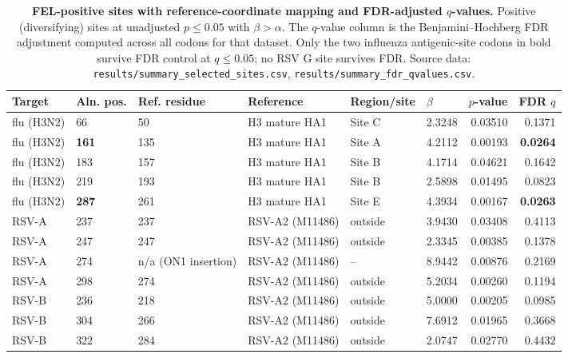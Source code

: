 \documentclass[11pt]{article}
\begin{document}
\begin{table}[H]
\centering
\scriptsize
\setlength{\tabcolsep}{3pt}
\caption{\textbf{FEL-positive sites with reference-coordinate mapping and FDR-adjusted $q$-values.} Positive (diversifying) sites at unadjusted $p\leq0.05$ with $\beta>\alpha$. The $q$-value column is the Benjamini--Hochberg FDR adjustment computed across all codons for that dataset. Only the two influenza antigenic-site codons in bold survive FDR control at $q\leq0.05$; no RSV G site survives FDR. Source data: \texttt{results/summary\_selected\_sites.csv}, \texttt{results/summary\_fdr\_qvalues.csv}.}
\label{tab:selected_sites}
\begin{tabular}{lllp{2.5cm}llrr}
\toprule
Target & Aln. pos. & Ref. residue & Reference & Region/site & $\beta$ & $p$-value & FDR $q$ \\
\midrule
flu (H3N2) & 66 & 50 & H3 mature HA1 & Site C & 2.3248 & 0.03510 & 0.1371 \\
flu (H3N2) & \textbf{161} & 135 & H3 mature HA1 & Site A & 4.2112 & 0.00193 & \textbf{0.0264} \\
flu (H3N2) & 183 & 157 & H3 mature HA1 & Site B & 4.1714 & 0.04621 & 0.1642 \\
flu (H3N2) & 219 & 193 & H3 mature HA1 & Site B & 2.5898 & 0.01495 & 0.0823 \\
flu (H3N2) & \textbf{287} & 261 & H3 mature HA1 & Site E & 4.3934 & 0.00167 & \textbf{0.0263} \\
RSV-A & 237 & 237 & RSV-A2 (M11486) & outside & 3.9430 & 0.03408 & 0.4113 \\
RSV-A & 247 & 247 & RSV-A2 (M11486) & outside & 2.3345 & 0.00385 & 0.1378 \\
RSV-A & 274 & n/a (ON1 insertion) & RSV-A2 (M11486) & -- & 8.9442 & 0.00876 & 0.2169 \\
RSV-A & 298 & 274 & RSV-A2 (M11486) & outside & 5.2034 & 0.00260 & 0.1194 \\
RSV-B & 236 & 218 & RSV-A2 (M11486) & outside & 5.0000 & 0.00205 & 0.0985 \\
RSV-B & 304 & 266 & RSV-A2 (M11486) & outside & 7.6912 & 0.01965 & 0.3668 \\
RSV-B & 322 & 284 & RSV-A2 (M11486) & outside & 2.0747 & 0.02770 & 0.4432 \\
\bottomrule
\end{tabular}
\end{table}
\end{document}
